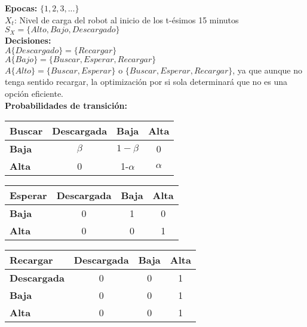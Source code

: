     \textbf{Epocas:} $\{1,2,3,...\}$\\
    $X_t$: Nivel de carga del robot al inicio de los t-ésimos 15 minutos\\
    $S_X=\{Alto, Bajo, Descargado\}$ \\
    \textbf{Decisiones:}\\
    $A\{Descargado\}=\{Recargar\}$\\
    $A\{Bajo\}=\{Buscar, Esperar, Recargar\}$\\
    $A\{Alto\}=\{Buscar, Esperar\}$ o $\{Buscar, Esperar, Recargar\}$, ya que aunque no tenga sentido recargar, la optimización por si sola determinará que no es una opción eficiente. \\
    \textbf{Probabilidades de transición:}
    \begin{table}[H]
    \centering
    \begin{tabular}{|l|c|c|c|}
    \hline
    \textbf{Buscar}     & \textbf{Descargada} & \textbf{Baja} & \textbf{Alta} \\ \hline   
    \textbf{Baja} & $\beta$   & $1-\beta$     & 0        \\ \hline              
    \textbf{Alta} & 0     & 1-$\alpha$      & $\alpha$           \\ \hline  
    \end{tabular}
    \end{table}
    \begin{table}[H]
    \centering
    \begin{tabular}{|l|c|c|c|}
    \hline
    \textbf{Esperar}     & \textbf{Descargada} & \textbf{Baja} & \textbf{Alta} \\ \hline   
    \textbf{Baja} & 0   & 1    & 0        \\ \hline              
    \textbf{Alta} & 0     & 0     & 1          \\ \hline  
    \end{tabular}
    \end{table}
    \begin{table}[H]
    \centering
    \begin{tabular}{|l|c|c|c|}
    \hline
    \textbf{Recargar}     & \textbf{Descargada} & \textbf{Baja} & \textbf{Alta} \\ \hline   
    \textbf{Descargada} & 0   & 0   & 1       \\ \hline   
    \textbf{Baja} & 0   & 0    & 1       \\ \hline              
    \textbf{Alta} & 0     & 0     & 1          \\ \hline  
    \end{tabular}
    \end{table}
